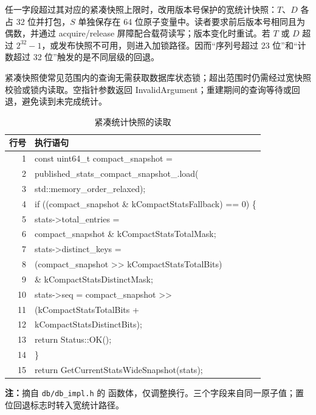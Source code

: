 \documentclass[UTF8,a4paper,10pt,twocolumn,fontset=fandol]{ctexart}
\begin{document}
任一字段超过其对应的紧凑快照上限时，改用版本号保护的宽统计快照：$T$、$D$ 各占 32 位并打包，$S$ 单独保存在 64 位原子变量中。读者要求前后版本号相同且为偶数，并通过 acquire/release 屏障配合载荷读写；版本变化时重试。若 $T$ 或 $D$ 超过 $2^{32}-1$，或发布快照不可用，则进入加锁路径。因而“序列号超过 23 位”和“计数超过 32 位”触发的是不同层级的回退。

紧凑快照使常见范围内的查询无需获取数据库状态锁；超出范围时仍需经过宽快照校验或锁内读取。空指针参数返回 InvalidArgument；重建期间的查询等待或回退，避免读到未完成统计。

\begin{table}[!htbp]
\centering
\caption{紧凑统计快照的读取}
\label{tab:code-stats}
\setlength{\tabcolsep}{3pt}
\renewcommand{\arraystretch}{1.05}
\begin{tabularx}{\columnwidth}{@{}r>{\ttfamily\fontsize{7.5}{9.5}\selectfont\raggedright\arraybackslash}X@{}}
\toprule
{\small 行号} & {\normalfont\small 执行语句} \\
\midrule
1 & const uint64\_t compact\_snapshot = \\
2 & \hspace*{1.8em}published\_stats\_compact\_snapshot\_.load( \\
3 & \hspace*{3.6em}std::memory\_order\_relaxed); \\
4 & if ((compact\_snapshot \& kCompactStatsFallback) == 0) \{ \\
5 & \hspace*{0.9em}stats->total\_entries = \\
6 & \hspace*{2.7em}compact\_snapshot \& kCompactStatsTotalMask; \\
7 & \hspace*{0.9em}stats->distinct\_keys = \\
8 & \hspace*{2.7em}(compact\_snapshot >> kCompactStatsTotalBits) \\
9 & \hspace*{2.7em}\& kCompactStatsDistinctMask; \\
10 & \hspace*{0.9em}stats->seq = compact\_snapshot >> \\
11 & \hspace*{2.7em}(kCompactStatsTotalBits + \\
12 & \hspace*{3.6em}kCompactStatsDistinctBits); \\
13 & \hspace*{0.9em}return Status::OK(); \\
14 & \} \\
15 & return GetCurrentStatsWideSnapshot(stats); \\
\bottomrule
\end{tabularx}
\par\vspace{3pt}
\parbox{\columnwidth}{\footnotesize\raggedright\textbf{注：}摘自 \texttt{db/db\_impl.h} 的  函数体，仅调整换行。三个字段来自同一原子值；置位回退标志时转入宽统计路径。}
\end{table}
\end{document}

